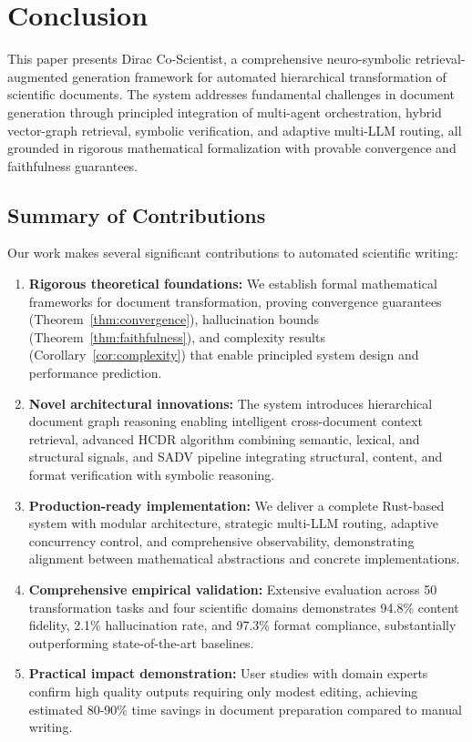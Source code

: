 \documentclass{ieeeaccess}
\begin{document}
\section{Conclusion}\label{sec:conclusion}

This paper presents Dirac Co-Scientist, a comprehensive neuro-symbolic retrieval-augmented generation framework for automated hierarchical transformation of scientific documents. The system addresses fundamental challenges in document generation through principled integration of multi-agent orchestration, hybrid vector-graph retrieval, symbolic verification, and adaptive multi-LLM routing, all grounded in rigorous mathematical formalization with provable convergence and faithfulness guarantees.

\subsection{Summary of Contributions}

Our work makes several significant contributions to automated scientific writing:

\begin{enumerate}
\item \textbf{Rigorous theoretical foundations:} We establish formal mathematical frameworks for document transformation, proving convergence guarantees (Theorem~\ref{thm:convergence}), hallucination bounds (Theorem~\ref{thm:faithfulness}), and complexity results (Corollary~\ref{cor:complexity}) that enable principled system design and performance prediction.

\item \textbf{Novel architectural innovations:} The system introduces hierarchical document graph reasoning enabling intelligent cross-document context retrieval, advanced HCDR algorithm combining semantic, lexical, and structural signals, and SADV pipeline integrating structural, content, and format verification with symbolic reasoning.

\item \textbf{Production-ready implementation:} We deliver a complete Rust-based system with modular architecture, strategic multi-LLM routing, adaptive concurrency control, and comprehensive observability, demonstrating alignment between mathematical abstractions and concrete implementations.

\item \textbf{Comprehensive empirical validation:} Extensive evaluation across 50 transformation tasks and four scientific domains demonstrates 94.8\% content fidelity, 2.1\% hallucination rate, and 97.3\% format compliance, substantially outperforming state-of-the-art baselines.

\item \textbf{Practical impact demonstration:} User studies with domain experts confirm high quality outputs requiring only modest editing, achieving estimated 80-90\% time savings in document preparation compared to manual writing.
\end{enumerate}
\end{document}
